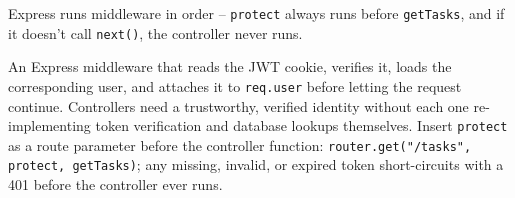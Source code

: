 \begin{tipbox}[TIP]
Express runs middleware in order -- \texttt{protect} always runs before \texttt{getTasks}, and if it doesn't call \texttt{next()}, the controller never runs.
\end{tipbox}

\whatwhyhow
{An Express middleware that reads the JWT cookie, verifies it, loads the corresponding user, and attaches it to \texttt{req.user} before letting the request continue.}
{Controllers need a trustworthy, verified identity without each one re-implementing token verification and database lookups themselves.}
{Insert \texttt{protect} as a route parameter before the controller function: \texttt{router.get("/tasks", protect, getTasks)}; any missing, invalid, or expired token short-circuits with a 401 before the controller ever runs.}
